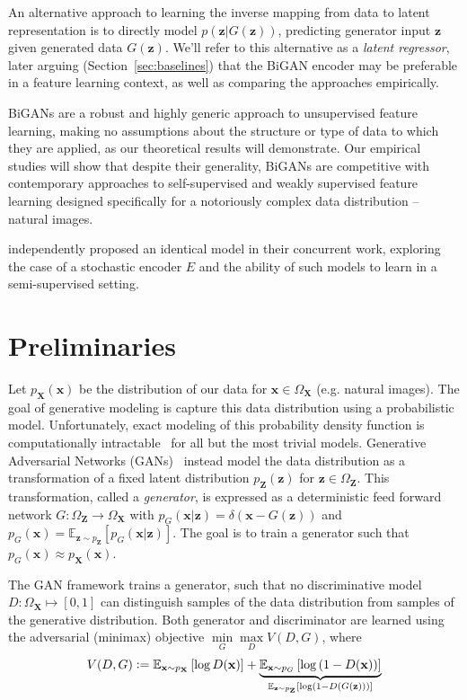\documentclass{article}
\newcommand{\expect}[2]{\mathbb{E}_{#1}\left[#2\right]}
\newcommand{\logp}[1]{\log\left(#1\right)}
\newcommand{\defeq}{\vcentcolon=}
\renewcommand{\vec}[1]{\mathbf{#1}}
\newcommand{\x}{\vec{x}}
\newcommand{\X}{\vec{X}}
\newcommand{\OX}{\Omega_\X}
\newcommand{\z}{\vec{z}}
\newcommand{\Z}{\vec{Z}}
\newcommand{\OZ}{\Omega_\Z}
\begin{document}
An alternative approach to learning the inverse mapping from data to latent representation
is to directly model $p(\z|G(\z))$,
predicting generator input $\z$ given generated data $G(\z)$.
We'll refer to this alternative as a \textit{latent regressor},
later arguing (Section~\ref{sec:baselines})
that the BiGAN encoder may be preferable in a feature learning context,
as well as comparing the approaches empirically.

BiGANs are a robust and highly generic approach to unsupervised feature learning,
making no assumptions about the structure or type of data to which they are applied,
as our theoretical results will demonstrate.
Our empirical studies will show that despite their generality,
BiGANs are competitive with contemporary approaches to self-supervised and weakly supervised feature learning
designed specifically for a notoriously complex data distribution -- natural images.

\citet{ali} independently proposed an identical model in their concurrent work,
exploring the case of a stochastic encoder $E$ and the ability of such models to learn in a semi-supervised setting.



\section{Preliminaries}
Let $p_\X(\x)$ be the distribution of our data for $\x \in \OX$ (e.g. natural images).
The goal of generative modeling is capture this data distribution using a probabilistic model.
Unfortunately, exact modeling of this probability density function is computationally intractable~\citep{hinton2006fast,salakhutdinov2009deep} for all but the most trivial models.
Generative Adversarial Networks (GANs)~\citep{gan} instead model the data distribution as a transformation of a fixed latent distribution $p_\Z(\z)$ for $\z \in \OZ$.
This transformation, called a \textit{generator}, is expressed as a deterministic feed forward network $G:\OZ \to \OX$ with $p_G(\x | \z) = \delta\left(\x - G(\z)\right)$ and $p_G(\x) = \expect{\z \sim p_\Z}{p_G(\x | \z)}$.
The goal is to train a generator such that $p_G(\x) \approx p_\X(\x)$.

The GAN framework trains a generator, such that no discriminative model $D : \OX \mapsto [0, 1]$ can distinguish samples of the data distribution from samples of the generative distribution.
Both generator and discriminator are learned using the adversarial (minimax) objective $\min\limits_G \max\limits_D V(D, G)$, where
\begin{equation}
V(D, G)
\defeq
\expect{\x \sim p_\X}{
  \log D(\x)
}
+
\underbrace{
  \expect{\x \sim p_G}{
    \logp{1 - D(\x)}
  }
}_{
  \mathbb{E}_{\z \sim p_\Z}[\logp{1 - D(G(\z))}]
}
\label{eq:generalganobj}
\end{equation}
\end{document}
